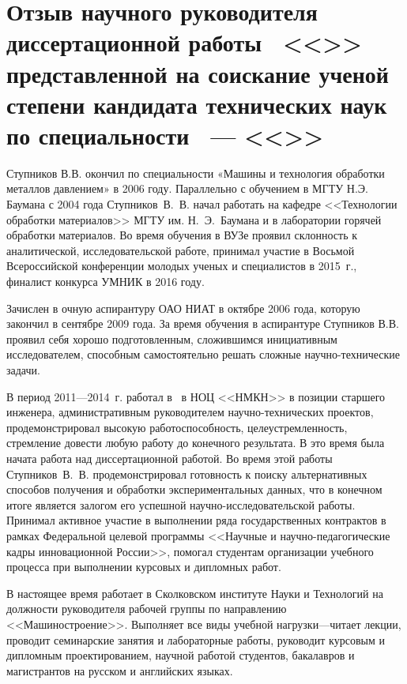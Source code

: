 
\section{Отзыв научного руководителя диссертационной работы \thesisAuthorLastNameFromFull\ <<{\thesisTitle}>> представленной на соискание ученой степени кандидата технических наук по специальности \thesisSpecialtyNumber\ --- <<\thesisSpecialtyTitle>>}


\vspace{30pt} %

Ступников В.В. окончил \thesisOrganizationShort по специальности «Машины и технология обработки металлов давлением» в 2006 году. Параллельно с обучением в МГТУ Н.Э. Баумана с 2004 года Ступников~В.~В. начал работать на кафедре <<Технологии обработки материалов>> МГТУ им. Н.~Э.~Баумана и в лаборатории горячей обработки материалов. Во время обучения в ВУЗе проявил склонность к аналитической, исследовательской работе, принимал участие в Восьмой Всероссийской конференции молодых ученых и специалистов в 2015~г., финалист конкурса УМНИК в 2016 году. 

Зачислен в очную аспирантуру ОАО НИАТ в октябре 2006 года, которую закончил в сентябре 2009 года. За время обучения в аспирантуре Ступников В.В. проявил себя хорошо подготовленным, сложившимся инициативным исследователем, способным самостоятельно решать сложные научно-технические задачи.

В период 2011---2014~г. работал в \thesisOrganizationShort\ в НОЦ <<НМКН>> в позиции старшего инженера, административным руководителем научно-технических проектов, продемонстрировал высокую работоспособность, целеустремленность, стремление довести любую работу до конечного результата. В это время была начата работа над диссертационной работой. Во время этой работы Ступников~В.~В. продемонстрировал готовность к поиску альтернативных способов получения и обработки экспериментальных данных, что в конечном итоге является залогом его успешной научно-исследовательской работы. Принимал активное участие в выполнении ряда государственных контрактов в рамках Федеральной целевой программы <<Научные и научно-педагогические кадры инновационной России>>, помогал студентам организации учебного процесса при выполнении курсовых и дипломных работ.

В настоящее время работает в Сколковском институте Науки и Технологий на должности руководителя рабочей группы по направлению <<Машиностроение>>. Выполняет все виды учебной нагрузки---читает лекции, проводит семинарские занятия и лабораторные работы, руководит курсовым и дипломным проектированием, научной работой студентов, бакалавров и магистрантов на русском и английских языках.

